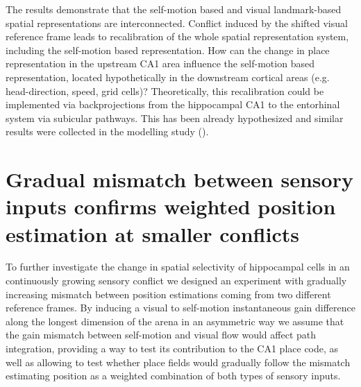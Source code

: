 The results demonstrate that the self-motion based and visual landmark-based spatial representations are interconnected. Conflict induced by the shifted visual reference frame leads to recalibration of the whole spatial representation system, including the self-motion based representation. How can the change in place representation in the upstream CA1 area influence the self-motion based representation, located hypothetically in the downstream cortical areas (e.g. head-direction, speed, grid cells)? Theoretically, this recalibration could be implemented via backprojections from the hippocampal CA1 to the entorhinal system via subicular pathways. This has been already hypothesized and similar results were collected in the modelling study (\cite{Li2020}).


\section{Gradual mismatch between sensory inputs confirms weighted position estimation at smaller conflicts}
\label{sec:gain_12}

To further investigate the change in spatial selectivity of hippocampal cells in an continuously growing sensory conflict we designed an experiment with gradually increasing mismatch between position estimations coming from two different reference frames. By inducing a visual to self-motion instantaneous gain difference along the longest dimension of the arena in an asymmetric way we assume that the gain mismatch between self-motion and visual flow would affect path integration, providing a way to test its contribution to the CA1 place code, as well as allowing to test whether place fields would gradually follow the mismatch estimating position as a weighted combination of both types of sensory inputs.

